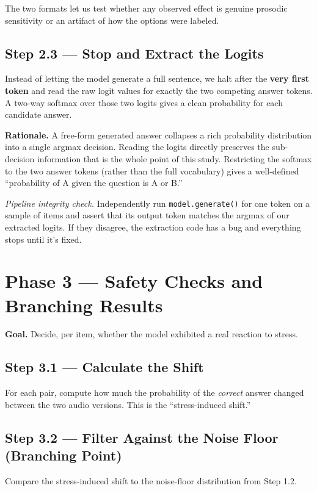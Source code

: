 \documentclass[11pt]{article}
\begin{document}
The two formats let us test whether any observed effect is genuine
prosodic sensitivity or an artifact of how the options were labeled.

\subsection*{Step 2.3 --- Stop and Extract the Logits}

Instead of letting the model generate a full sentence, we halt after
the \textbf{very first token} and read the raw logit values for
exactly the two competing answer tokens. A two-way softmax over those
two logits gives a clean probability for each candidate answer.

\textbf{Rationale.} A free-form generated answer collapses a rich
probability distribution into a single argmax decision. Reading the
logits directly preserves the sub-decision information that is the
whole point of this study. Restricting the softmax to the two answer
tokens (rather than the full vocabulary) gives a well-defined
``probability of A given the question is A or B.''

\textit{Pipeline integrity check.} Independently run
\texttt{model.generate()} for one token on a sample of items and
assert that its output token matches the argmax of our extracted
logits. If they disagree, the extraction code has a bug and
everything stops until it's fixed.

\section{Phase 3 --- Safety Checks and Branching Results}

\textbf{Goal.} Decide, per item, whether the model exhibited a real
reaction to stress.

\subsection*{Step 3.1 --- Calculate the Shift}

For each pair, compute how much the probability of the \emph{correct}
answer changed between the two audio versions. This is the
``stress-induced shift.''

\subsection*{Step 3.2 --- Filter Against the Noise Floor (Branching Point)}

Compare the stress-induced shift to the noise-floor distribution from
Step 1.2.
\end{document}
